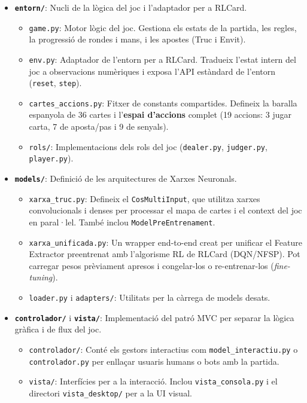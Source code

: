 \documentclass[a4paper,11pt]{report}
\begin{document}
\begin{itemize}
    \item \textbf{\texttt{entorn/}}: Nucli de la lògica del joc i l'adaptador per a RLCard.
    \begin{itemize}
        \item \texttt{game.py}: Motor lògic del joc. Gestiona els estats de la partida, les regles, la progressió de rondes i mans, i les apostes (Truc i Envit).
        \item \texttt{env.py}: Adaptador de l'entorn per a RLCard. Tradueix l'estat intern del joc a observacions numèriques i exposa l'API estàndard de l'entorn (\texttt{reset}, \texttt{step}).
        \item \texttt{cartes\_accions.py}: Fitxer de constants compartides. Defineix la baralla espanyola de 36 cartes i l'\textbf{espai d'accions} complet (19 accions: 3 jugar carta, 7 de aposta/pas i 9 de senyals).
        \item \texttt{rols/}: Implementacions dels rols del joc (\texttt{dealer.py}, \texttt{judger.py}, \texttt{player.py}).
    \end{itemize}

    \item \textbf{\texttt{models/}}: Definició de les arquitectures de Xarxes Neuronals.
    \begin{itemize}
        \item \texttt{xarxa\_truc.py}: Defineix el \texttt{CosMultiInput}, que utilitza xarxes convolucionals i denses per processar el mapa de cartes i el context del joc en paral·lel. També inclou \texttt{ModelPreEntrenament}.
        \item \texttt{xarxa\_unificada.py}: Un wrapper end-to-end creat per unificar el Feature Extractor preentrenat amb l'algorisme RL de RLCard (DQN/NFSP). Pot carregar pesos prèviament apresos i congelar-los o re-entrenar-los (\textit{fine-tuning}).
        \item \texttt{loader.py} i \texttt{adapters/}: Utilitats per la càrrega de models desats.
    \end{itemize}

    \item \textbf{\texttt{controlador/}} i \textbf{\texttt{vista/}}: Implementació del patró MVC per separar la lògica gràfica i de flux del joc.
    \begin{itemize}
        \item \texttt{controlador/}: Conté els gestors interactius com \texttt{model\_interactiu.py} o \texttt{controlador.py} per enllaçar usuaris humans o bots amb la partida.
        \item \texttt{vista/}: Interfícies per a la interacció. Inclou \texttt{vista\_consola.py} i el directori \texttt{vista\_desktop/} per a la UI visual.
    \end{itemize}


\end{itemize}
\end{document}
